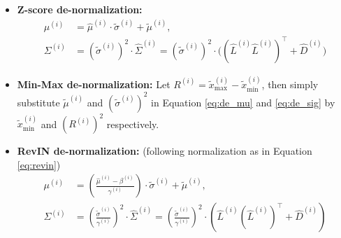 \documentclass[a4paper,oneside,bibliography=totoc]{scrbook}
\begin{document}
\begin{itemize}
    \item \textbf{Z-score de-normalization:}
    \begin{align}
    \label{eq:de_mu}
    \mu^{(i)} &= \hat{\mu}^{(i)} \cdot \tilde{\sigma}^{(i)} + \tilde{\mu}^{(i)}, \\
    \label{eq:de_sig}
    \Sigma^{(i)} &= (\tilde{\sigma}^{(i)})^2 \cdot \hat{\Sigma}^{(i)} = (\tilde{\sigma}^{(i)})^2 \cdot \big((\hat{L}^{(i)} \hat{L}^{(i)})^\top + \hat{D}^{(i)}\big)
    \end{align}
    \item \textbf{Min-Max de-normalization:} Let \( R^{(i)} = \tilde{x}_{\max}^{(i)} - \tilde{x}_{\min}^{(i)} \), then simply substitute $\tilde{\mu}^{(i)}$ and $(\tilde{\sigma}^{(i)})^2$ in Equation \ref{eq:de_mu} and \ref{eq:de_sig} by $\tilde{x}_{\min}^{(i)}$ and $(R^{(i)})^2$ respectively.
    \item \textbf{RevIN de-normalization:} (following normalization as in Equation \ref{eq:revin}) 
    \begin{align}
    \mu^{(i)} &= \left( \frac{\hat{\mu}^{(i)} - \beta^{(i)}}{\gamma^{(i)}} \right) \cdot \tilde{\sigma}^{(i)} + \tilde{\mu}^{(i)}, \\
    \Sigma^{(i)} &= \left( \frac{\tilde{\sigma}^{(i)}}{\gamma^{(i)}} \right)^2 \cdot \hat{\Sigma}^{(i)} = \left( \frac{\tilde{\sigma}^{(i)}}{\gamma^{(i)}} \right)^2 \cdot \left( \hat{L}^{(i)} (\hat{L}^{(i)})^\top + \hat{D}^{(i)} \right)
    \end{align}
\end{itemize}


\end{document}

